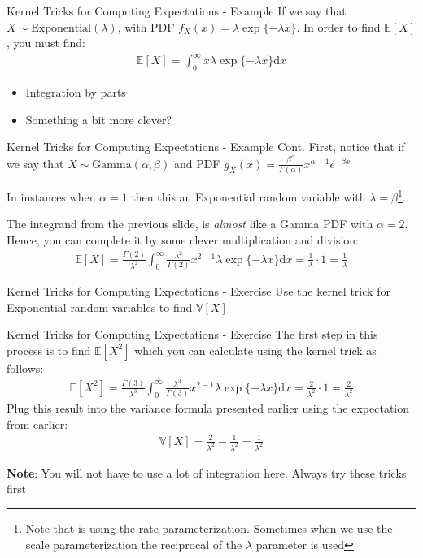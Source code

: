 \documentclass{beamer}
\begin{document}
\begin{frame}{Kernel Tricks for Computing Expectations - Example}
If we say that $X\sim\mathrm{Exponential}(\lambda)$, with PDF $f_{X}(x) = \lambda\exp\{-\lambda x\}$. In order to find $\mathbb{E}[X]$, you must find:
\begin{align*}
\mathbb{E}[X] = \int_{0}^{\infty} x\lambda\exp\{-\lambda x\} \mathrm{d}x
\end{align*}
\begin{itemize}
\item{Integration by parts}
\item{Something a bit more clever?}
\end{itemize}
\end{frame}

\begin{frame}{Kernel Tricks for Computing Expectations - Example Cont.}
First, notice that if we say that $X\sim\mathrm{Gamma}(\alpha, \beta)$ and PDF $g_{X}(x) = \frac{\beta^{\alpha}}{\Gamma(\alpha)} x^{\alpha - 1} e^{-\beta x}$
\newline

In instances when $\alpha = 1$ then this an Exponential random variable with $\lambda = \beta$\footnote{Note that is using the rate parameterization. Sometimes when we use the scale parameterization the reciprocal of the $\lambda$ parameter is used}. 
\newline 

The integrand from the previous slide, is \emph{almost} like a Gamma PDF with $\alpha = 2$. Hence, you can complete it by some clever multiplication and division:
\begin{align*}
\mathbb{E}[X] = \frac{\Gamma(2)}{\lambda^{2}}\int_{0}^{\infty}\frac{\lambda^{2}}{\Gamma(2)} x^{2-1}\lambda\exp\{-\lambda x\} \mathrm{d}x = \frac{1}{\lambda} \cdot 1 = \frac{1}{\lambda}
\end{align*}
\end{frame}

\begin{frame}{Kernel Tricks for Computing Expectations - Exercise}
Use the kernel trick for Exponential random variables to find $\mathbb{V}[X]$
\end{frame}


\begin{frame}{Kernel Tricks for Computing Expectations - Exercise}
The first step in this process is to find $\mathbb{E}[X^{2}]$ which you can calculate using the kernel trick as follows:
\begin{align*}
\mathbb{E}[X^{2}] = \frac{\Gamma(3)}{\lambda^{3}}\int_{0}^{\infty}\frac{\lambda^{3}}{\Gamma(3)} x^{2-1}\lambda\exp\{-\lambda x\} \mathrm{d}x = \frac{2}{\lambda^{2}} \cdot 1 = \frac{2}{\lambda^{2}}
\end{align*}
Plug this result into the variance formula presented earlier using the expectation from earlier:
\begin{align*}
\mathbb{V}[X] = \frac{2}{\lambda^{2}} - \frac{1}{\lambda^{2}} = \frac{1}{\lambda^{2}}
\end{align*}

\textbf{Note}: You will not have to use a lot of integration here. Always try these tricks first
\end{frame}
\end{document}
